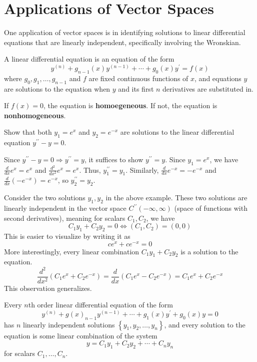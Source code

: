 \section{Applications of Vector Spaces}
One application of vector spaces is in identifying solutions to linear differential equations that are linearly independent, specifically involving the Wronskian.
\begin{definition}
    A linear differential equation is an equation of the form 
    \[
        y^{(n)} + g_{n-1}(x)y^{(n-1)} + \cdots + g_0 (x)y^{\prime} =f(x)
    \]
    where \(g_0,g_1,\ldots,g_{n-1} \) and \(f\) are fixed continuous functions of \(x\), and equations \(y\) are solutions to the equation when \(y\) and its first \(n\) derivatives are substituted in.
\end{definition}
If \(f(x)=0\), the equation is \textbf{homoegeneous}. If not, the equation is \textbf{nonhomogeneous}.
\begin{exercise}
    Show that both \(y_1=e^x\) and \(y_2 =e^{-x} \) are solutions to the linear differential equation \(y^{\prime\prime} -y=0\).
\end{exercise}
\begin{solution}
    Since \(y^{\prime\prime} -y=0 \Longrightarrow y^{\prime\prime} =y\), it suffices to show \(y^{\prime\prime} =y\). Since \(y_1 = e^x\), we have \(\frac{d}{dx}e^x = e^x\) and \(\frac{d^2}{dx^2}e^x = e^x\). Thus, \(y_1^{\prime\prime} =y_1\). Similarly, \(\frac{d}{dx}e^{-x}=-e^{-x}  \) and \(\frac{d}{dx}\left(-e^{-x}\right)=e^{-x}  \), so \(y_2^{\prime\prime} =y_2\).
\end{solution}
Consider the two solutions \(y_1,y_2\) in the above example. These two solutions are linearly independent in the vector space \(C^{\prime\prime} (-\infty,\infty)\) (space of functions with second derivatives), meaning for scalars \(C_1,C_2\), we have
\[
    C_1 y_1 + C_2 y_2 = 0 \iff \left( C_1,C_2 \right) =(0,0)
\]
This is easier to visualize by writing it as 
\[
    ce^x + ce^{-x} = 0 
\]
More interestingly, every linear combination \(C_1 y_1 + C_2 y_2\) is a solution to the equation. 
\[
    \frac{d^2}{dx^2}\left( C_1 e^x + C_2 e^{-x}  \right) =\frac{d}{dx}\left( C_1 e^x - C_2 e^{-x}  \right) =C_1 e^x + C_2 e^{-x} 
\]
This observation generalizes.
\begin{theorem}
    Every \(n\)th order linear differential equation of the form 
    \[
        y^{(n)} + g(x)_{n-1}y^{(n-1)}+\cdots+g_1(x)y^{\prime} +g_0(x)y = 0 
    \]
    has \(n\) linearly independent solutions \(\left\{ y_1,y_2,\ldots,y_n \right\} \), and every solution to the equation is some linear combination of the system
    \[
        y = C_1 y_1 + C_2 y_2 + \cdots + C_n y_n        
    \]
    for scalars \(C_1,\ldots,C_n\).
\end{theorem}
